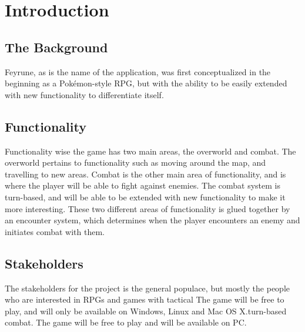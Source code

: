 \section{Introduction}

\begin{comment}
Give some background and explain the purpose of this application. Describe
the functionality of the application. Describe the stakeholders of the project,
highlight who will benefit from/use this particular application.
\end{comment}
\subsection{The Background}
Feyrune, as is the name of the application, was first conceptualized in the beginning as a Pokémon-style RPG, but with the ability to be easily extended with new functionality to differentiate itself.

\subsection{Functionality}
Functionality wise the game has two main areas, the overworld and combat. The overworld pertains to functionality such as moving around the map, and travelling to new areas. Combat is the other main area of functionality, and is where the player will be able to fight against enemies. The combat system is turn-based, and will be able to be extended with new functionality to make it more interesting. These two different areas of functionality is glued together by an encounter system, which determines when the player encounters an enemy and initiates combat with them.

\subsection{Stakeholders}
The stakeholders for the project is the general populace, but mostly the people who are interested in RPGs and games with tactical The game will be free to play, and will only be available on Windows, Linux and Mac OS X.turn-based combat. The game will be free to play and will be available on PC.



